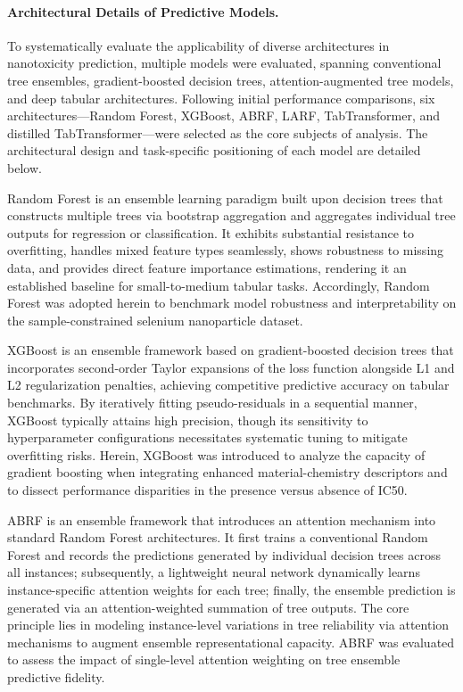 \paragraph{Architectural Details of Predictive Models.}
To systematically evaluate the applicability of diverse architectures in nanotoxicity prediction, multiple models were evaluated, spanning conventional tree ensembles, gradient-boosted decision trees, attention-augmented tree models, and deep tabular architectures. Following initial performance comparisons, six architectures—Random Forest, XGBoost, ABRF, LARF, TabTransformer, and distilled TabTransformer—were selected as the core subjects of analysis. The architectural design and task-specific positioning of each model are detailed below.

Random Forest is an ensemble learning paradigm built upon decision trees that constructs multiple trees via bootstrap aggregation and aggregates individual tree outputs for regression or classification. It exhibits substantial resistance to overfitting, handles mixed feature types seamlessly, shows robustness to missing data, and provides direct feature importance estimations, rendering it an established baseline for small-to-medium tabular tasks. Accordingly, Random Forest was adopted herein to benchmark model robustness and interpretability on the sample-constrained selenium nanoparticle dataset.

XGBoost is an ensemble framework based on gradient-boosted decision trees that incorporates second-order Taylor expansions of the loss function alongside L1 and L2 regularization penalties, achieving competitive predictive accuracy on tabular benchmarks. By iteratively fitting pseudo-residuals in a sequential manner, XGBoost typically attains high precision, though its sensitivity to hyperparameter configurations necessitates systematic tuning to mitigate overfitting risks. Herein, XGBoost was introduced to analyze the capacity of gradient boosting when integrating enhanced material-chemistry descriptors and to dissect performance disparities in the presence versus absence of IC50.

ABRF is an ensemble framework that introduces an attention mechanism into standard Random Forest architectures. It first trains a conventional Random Forest and records the predictions generated by individual decision trees across all instances; subsequently, a lightweight neural network dynamically learns instance-specific attention weights for each tree; finally, the ensemble prediction is generated via an attention-weighted summation of tree outputs. The core principle lies in modeling instance-level variations in tree reliability via attention mechanisms to augment ensemble representational capacity. ABRF was evaluated to assess the impact of single-level attention weighting on tree ensemble predictive fidelity.

